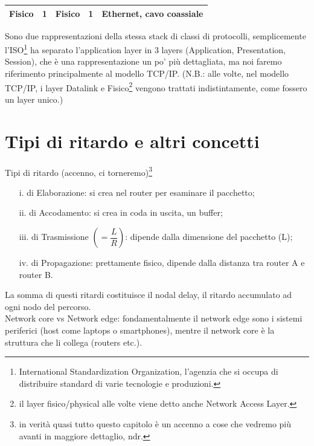 \begin{table}[h]
\begin{tabular}{|ll|ll|l}
\multicolumn{1}{|l|}{Fisico}       & 1  & \multicolumn{1}{l|}{Fisico}                                                                          & 1                                                 & \multicolumn{1}{l|}{Ethernet, cavo coassiale}                                                        \\ \hline
\end{tabular}
\end{table}

 \noindent Sono due rappresentazioni della stessa stack di classi di protocolli, semplicemente l'ISO\footnote{International Standardization Organization, l'agenzia che si occupa di distribuire standard di varie tecnologie e produzioni.} ha separato l'application layer in 3 layers (Application, Presentation, Session), che è una rappresentazione un po' più dettagliata, ma noi faremo riferimento principalmente al modello TCP/IP. (N.B.: alle volte, nel modello TCP/IP, i layer Datalink e Fisico\footnote{il layer fisico/physical alle volte viene detto anche Network Access Layer.} vengono trattati indistintamente, come fossero un layer unico.) \\

\section*{Tipi di ritardo e altri concetti}
\noindent Tipi di ritardo (accenno, ci torneremo)\footnote{in verità quasi tutto questo capitolo è un accenno a cose che vedremo più avanti in maggiore dettaglio, ndr.} 
\begin{itemize}
    \item [i.] di Elaborazione: si crea nel router per esaminare il pacchetto;
    \item [ii.] di Accodamento: si crea in coda in uscita, un buffer;
    \item [iii.] di Trasmissione $(=\dfrac{L}{R})$: dipende dalla dimensione del pacchetto (L);
    \item[iv.] di Propagazione: prettamente fisico, dipende dalla distanza tra router A e router B.
\end{itemize}

\noindent La somma di questi ritardi costituisce il nodal delay, il ritardo accumulato ad ogni nodo del percorso. \\

\noindent {}Network core vs Network edge: fondamentalmente il network edge sono i sistemi periferici (host come laptops o smartphones), mentre il network core è la struttura che li collega (routers etc.). \\


